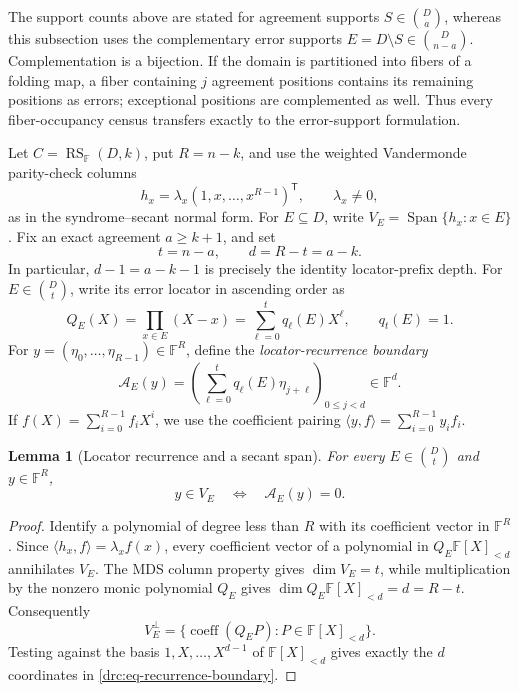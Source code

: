 \documentclass[11pt,a4paper]{amsart}
\numberwithin{equation}{section}
\newtheorem{lemma}[lemma]{Lemma}
\theoremstyle{remark}
\DeclareMathOperator{\RS}{RS}
\DeclareMathOperator{\Span}{Span}
\newcommand{\F}{\mathbb F}
\begin{document}
The support counts above are stated for agreement supports
\(S\in\binom Da\), whereas this subsection uses the complementary error
supports \(E=D\setminus S\in\binom D{n-a}\).  Complementation is a
bijection.  If the domain is partitioned into fibers of a folding map, a
fiber containing \(j\) agreement positions contains its remaining positions
as errors; exceptional positions are complemented as well.  Thus every
fiber-occupancy census transfers exactly to the error-support formulation.

Let \(C=\RS_\F(D,k)\), put \(R=n-k\), and use the weighted Vandermonde
parity-check columns
\[
 h_x=\lambda_x(1,x,\ldots,x^{R-1})^{\mathsf T},
 \qquad \lambda_x\ne0,
\]
as in the syndrome--secant normal form.  For \(E\subseteq D\), write
\(V_E=\Span\{h_x:x\in E\}\).  Fix an exact agreement \(a\ge k+1\), and set
\[
             t=n-a,\qquad d=R-t=a-k.
             \tag{DR0}\label{drc:eq-depth}
\]
In particular, \(d-1=a-k-1\) is precisely the identity locator-prefix
depth.  For \(E\in\binom Dt\), write its error locator in ascending order as
\[
 Q_E(X)=\prod_{x\in E}(X-x)=\sum_{\ell=0}^{t}q_\ell(E)X^\ell,
 \qquad q_t(E)=1.
\]
For \(y=(\eta_0,\ldots,\eta_{R-1})\in\F^R\), define the
\emph{locator-recurrence boundary}
\[
 \mathcal A_E(y)=
 \left(\sum_{\ell=0}^{t}q_\ell(E)\eta_{j+\ell}\right)_{0\le j<d}
 \in\F^d.
 \tag{DR1}\label{drc:eq-recurrence-boundary}
\]
If \(f(X)=\sum_{i=0}^{R-1}f_iX^i\), we use the coefficient pairing
\(
 \langle y,f\rangle=\sum_{i=0}^{R-1}y_if_i
\).

\begin{lemma}[Locator recurrence and a secant span]
\label{drc:lem-locator-recurrence}
For every \(E\in\binom Dt\) and \(y\in\F^R\),
\[
                         y\in V_E
             \quad\Longleftrightarrow\quad
                         \mathcal A_E(y)=0.
             \tag{DR2}\label{drc:eq-recurrence-membership}
\]
\end{lemma}

\begin{proof}
Identify a polynomial of degree less than \(R\) with its coefficient
vector in \(\F^R\).  Since
\(
 \langle h_x,f\rangle=\lambda_xf(x)
\), every coefficient vector of a polynomial in
\(Q_E\F[X]_{<d}\) annihilates \(V_E\).  The MDS column property gives
\(\dim V_E=t\), while multiplication by the nonzero monic polynomial
\(Q_E\) gives
\(\dim Q_E\F[X]_{<d}=d=R-t\).  Consequently
\[
 V_E^\perp=
 \{\operatorname{coeff}(Q_EP):P\in\F[X]_{<d}\}.
\]
Testing against the basis \(1,X,\ldots,X^{d-1}\) of
\(\F[X]_{<d}\) gives exactly the \(d\) coordinates in
\eqref{drc:eq-recurrence-boundary}.
\end{proof}
\end{document}
